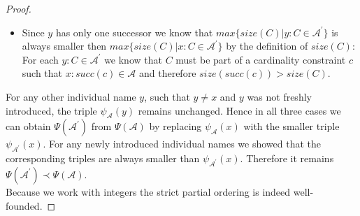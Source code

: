 \documentclass{book}
\theoremstyle{break}
\theoremstyle{definition}
\begin{document}
\begin{proof}
\begin{itemize}
\begin{itemize}
\item Since $y$ has only one successor we know that $max\{size(C)|y:C\in\mathcal{A}^\prime\}$ is always smaller then $max\{size(C)|x:C\in\mathcal{A}^\prime\}$ by the definition of $size(C)$: For each $y:C\in\mathcal{A}^\prime$ we know that $C$ must be part of a cardinality constraint $c$ such that $x:succ(c)\in\mathcal{A}$ and therefore $size(succ(c))>size(C)$.
\end{itemize} 
\end{itemize}
For any other individual name $y$, such that $y\neq x$ and $y$ was not freshly introduced, the triple $\psi_\mathcal{A}(y)$ remains unchanged. Hence in all three cases we can obtain $\Psi(\mathcal{A}^\prime)$ from $\Psi(\mathcal{A})$ by replacing $\psi_\mathcal{A}(x)$ with the smaller triple $\psi_{\mathcal{A}^\prime}(x)$. For any newly introduced individual names we showed that the corresponding triples are always smaller than $\psi_{\mathcal{A}^\prime}(x)$. Therefore it remains $\Psi(\mathcal{A}^\prime)\prec\Psi(\mathcal{A})$. \\
Because we work with integers the strict partial ordering is indeed well-founded.
\end{proof}
\end{document}
